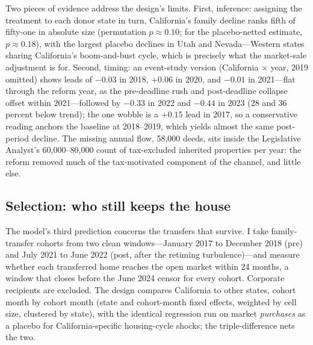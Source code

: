 \documentclass[12pt, letterpaper]{article}
\begin{document}
Two pieces of evidence address the design's limits. First, inference:
assigning the treatment to each donor state in turn, California's family
decline ranks fifth of fifty-one in absolute size (permutation
$p \approx 0.10$; for the placebo-netted estimate, $p \approx 0.18$), with
the largest placebo declines in Utah and Nevada---Western states sharing
California's boom-and-bust cycle, which is precisely what the market-sale
adjustment is for. Second, timing: an event-study version (California
$\times$ year, 2019 omitted) shows leads of $-0.03$ in 2018, $+0.06$ in
2020, and $-0.01$ in 2021---flat through the reform year, as the
pre-deadline rush and post-deadline collapse offset within 2021---followed
by $-0.33$ in 2022 and $-0.44$ in 2023 (28 and 36 percent below trend); the
one wobble is a $+0.15$ lead in 2017, so a conservative reading anchors the
baseline at 2018--2019, which yields almost the same post-period decline.
The missing annual flow, 58,000 deeds, sits inside the Legislative Analyst's
60,000--80,000 count of tax-excluded inherited properties per year: the
reform removed much of the tax-motivated component of the channel, and
little else.



\subsection{Selection: who still keeps the house}

The model's third prediction concerns the transfers that survive. I take
family-transfer cohorts from two clean windows---January 2017 to December
2018 (pre) and July 2021 to June 2022 (post, after the retiming
turbulence)---and measure whether each transferred home reaches the open
market within 24 months, a window that closes before the June 2024 censor
for every cohort. Corporate recipients are excluded. The design compares
California to other states, cohort month by cohort month (state and
cohort-month fixed effects, weighted by cell size, clustered by state), with
the identical regression run on market \emph{purchases} as a placebo for
California-specific housing-cycle shocks; the triple-difference nets the two.
\end{document}
